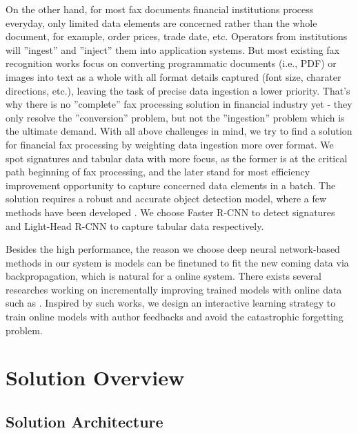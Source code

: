 \documentclass[sigconf]{acmart}
\begin{document}
On the other hand, for most fax documents financial institutions process everyday, only limited data elements are concerned rather than the whole document, for example, order prices, trade date, etc. Operators from institutions will ''ingest'' and ''inject'' them into application systems. But most existing fax recognition works focus on converting programmatic documents (i.e., PDF) or images into text as a whole with all format details captured (font size, charater directions, etc.), leaving the task of precise data ingestion a lower priority. That's why there is no ''complete'' fax processing solution in financial industry yet - they only resolve the ''conversion'' problem, but not the ''ingestion'' problem which is the ultimate demand. With all above challenges in mind, we try to find a solution for financial fax processing by weighting data ingestion more over format. We spot signatures and tabular data with more focus, as the former is at the critical path beginning of fax processing, and the later stand for most efficiency improvement opportunity to capture concerned data elements in a batch. The solution requires a robust and accurate object detection model, where a few methods have been developed \cite{ren2015faster, dai2016r, li2017light}. We choose Faster R-CNN \cite{ren2015faster} to detect signatures and Light-Head R-CNN \cite{li2017light} to capture tabular data respectively. 

Besides the high performance, the reason we choose deep neural network-based methods in our system is models can be finetuned to fit the new coming data via backpropagation, which is natural for a online system. There exists several researches working on incrementally improving trained models with online data such as \cite{shmelkov2017incremental, su2016line}. Inspired by such works, we design an interactive learning strategy to train online models with author feedbacks and avoid the catastrophic forgetting problem.

\section{Solution Overview}
\subsection{Solution Architecture}
\end{document}
